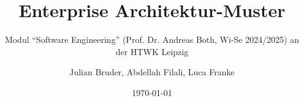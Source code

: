 \title[Enterprise Architektur-Muster]{Enterprise Architektur-Muster}
\subtitle{Modul “Software Engineering” (Prof. Dr. Andreas Both, Wi-Se 2024/2025) an der HTWK Leipzig}
\author{Julian Bruder, Abdellah Filali, Luca Franke}
\newcommand{\faculty}{Fakultät Informatik und Medien}
\newcommand{\university}{HTWK Leipzig}
\newcommand{\universityLong}{Modul “Software Engineering” (Prof. Dr. Andreas Both, Wi-Se 2024/2025) an der HTWK Leipzig}
\date{\today}





